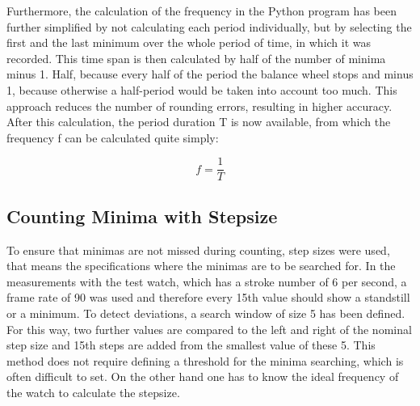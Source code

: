 \documentclass[12pt, a4paper]{report}
\begin{document}
    Furthermore, the calculation of the frequency in the Python program has been further simplified by not calculating each period individually, but by selecting the first and the last minimum over the whole period of time, in which it was recorded. This time span is then calculated by half of the number of minima minus 1. Half, because every half of the period the balance wheel stops and minus 1, because otherwise a half-period would be taken into account too much. This approach reduces the number of rounding errors, resulting in higher accuracy. After this calculation, the period duration T is now available, from which the frequency f can be calculated quite simply: 
    
     \begin{displaymath}
      f = \frac{1}{T}
     \end{displaymath}
     
  \subsection{Counting Minima with Stepsize}
  To ensure that minimas are not missed during counting, step sizes were used, that means the specifications where the minimas are to be searched for. In the measurements with the test watch, which has a stroke number of 6 per second, a frame rate of 90 was used and therefore every 15th value should show a standstill or a minimum. To detect deviations, a search window of size 5 has been defined.
  For this way, two further values are compared to the left and right of the nominal step size and 15th steps are added from the smallest value of these 5. This method does not require defining a threshold for the minima searching, which is often difficult to set. On the other hand one has to know the ideal frequency of the watch to calculate the stepsize.
  
\end{document}
